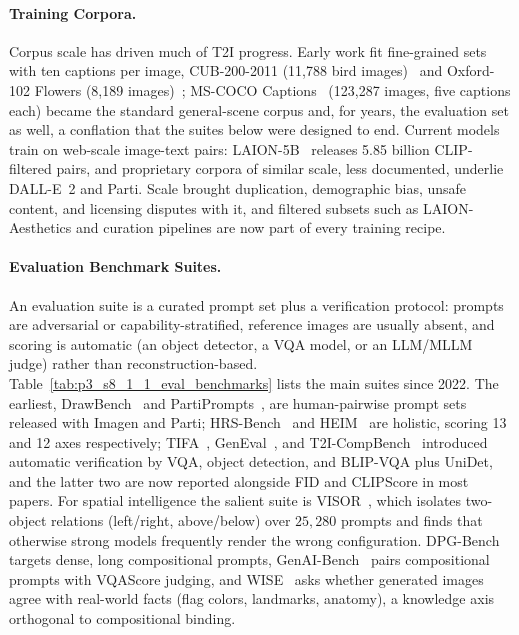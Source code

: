 \paragraph{Training Corpora.}
Corpus scale has driven much of T2I progress.
Early work fit fine-grained sets with ten captions per image, CUB-200-2011 (11,788 bird images)~\cite{wah2011cub} and Oxford-102 Flowers (8,189 images)~\cite{nilsback2008flowers}; MS-COCO Captions~\cite{lin2014microsoft} (123,287 images, five captions each) became the standard general-scene corpus and, for years, the evaluation set as well, a conflation that the suites below were designed to end.
Current models train on web-scale image-text pairs: LAION-5B~\cite{schuhmann2022laion5b} releases 5.85 billion CLIP-filtered pairs, and proprietary corpora of similar scale, less documented, underlie DALL-E~2 and Parti.
Scale brought duplication, demographic bias, unsafe content, and licensing disputes with it, and filtered subsets such as LAION-Aesthetics and curation pipelines are now part of every training recipe.

\paragraph{Evaluation Benchmark Suites.}
An evaluation suite is a curated prompt set plus a verification protocol: prompts are adversarial or capability-stratified, reference images are usually absent, and scoring is automatic (an object detector, a VQA model, or an LLM/MLLM judge) rather than reconstruction-based.
Table~\ref{tab:p3_s8_1_1_eval_benchmarks} lists the main suites since 2022.
The earliest, DrawBench~\cite{saharia2022photorealistic} and PartiPrompts~\cite{parti2022}, are human-pairwise prompt sets released with Imagen and Parti; HRS-Bench~\cite{bakr2023hrsbench} and HEIM~\cite{lee2023heim} are holistic, scoring 13 and 12 axes respectively; TIFA~\cite{hu2023tifa}, GenEval~\cite{ghosh2023geneval}, and T2I-CompBench~\cite{huang2023t2icompbench} introduced automatic verification by VQA, object detection, and BLIP-VQA plus UniDet, and the latter two are now reported alongside FID and CLIPScore in most papers.
For spatial intelligence the salient suite is VISOR~\cite{gokhale2022visor}, which isolates two-object relations (left/right, above/below) over $25{,}280$ prompts and finds that otherwise strong models frequently render the wrong configuration.
DPG-Bench~\cite{hu2024ella} targets dense, long compositional prompts, GenAI-Bench~\cite{li2024genaibench} pairs compositional prompts with VQAScore judging, and WISE~\cite{niu2025wise} asks whether generated images agree with real-world facts (flag colors, landmarks, anatomy), a knowledge axis orthogonal to compositional binding.

